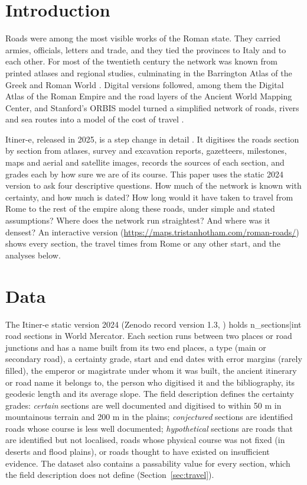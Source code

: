 \documentclass[11pt,a4paper]{article}
\begin{document}
\section{Introduction}
Roads were among the most visible works of the Roman state. They carried armies, officials, letters and trade, and they tied the provinces to Italy and to each other. For most of the twentieth century the network was known from printed atlases and regional studies, culminating in the Barrington Atlas of the Greek and Roman World \citep{talbert2000}. Digital versions followed, among them the Digital Atlas of the Roman Empire \citep{dare} and the road layers of the Ancient World Mapping Center, and Stanford's ORBIS model turned a simplified network of roads, rivers and sea routes into a model of the cost of travel \citep{orbis,scheidel2014}.

Itiner-e, released in 2025, is a step change in detail \citep{itinere,desoto2025}. It digitises the roads section by section from atlases, survey and excavation reports, gazetteers, milestones, maps and aerial and satellite images, records the sources of each section, and grades each by how sure we are of its course. This paper uses the static 2024 version to ask four descriptive questions. How much of the network is known with certainty, and how much is dated? How long would it have taken to travel from Rome to the rest of the empire along these roads, under simple and stated assumptions? Where does the network run straightest? And where was it densest? An interactive version (\url{https://maps.tristanhotham.com/roman-roads/}) shows every section, the travel times from Rome or any other start, and the analyses below.

\section{Data}
The Itiner-e static version 2024 (Zenodo record version 1.3, \citealp{itinere}) holds {{n_sections|int}} road sections in World Mercator. Each section runs between two places or road junctions and has a name built from its two end places, a type (main or secondary road), a certainty grade, start and end dates with error margins (rarely filled), the emperor or magistrate under whom it was built, the ancient itinerary or road name it belongs to, the person who digitised it and the bibliography, its geodesic length and its average slope. The field description defines the certainty grades: \emph{certain} sections are well documented and digitised to within 50 m in mountainous terrain and 200 m in the plains; \emph{conjectured} sections are identified roads whose course is less well documented; \emph{hypothetical} sections are roads that are identified but not localised, roads whose physical course was not fixed (in deserts and flood plains), or roads thought to have existed on insufficient evidence. The dataset also contains a passability value for every section, which the field description does not define (Section~\ref{sec:travel}).
\end{document}
